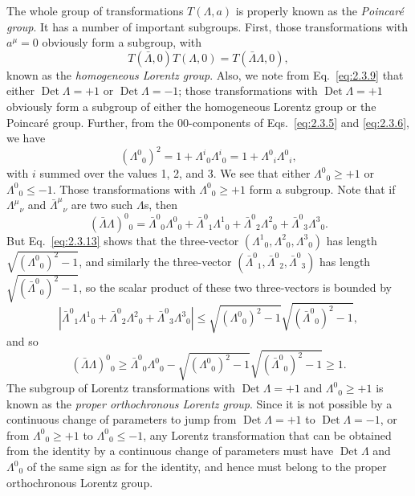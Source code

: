 The whole group of transformations $T(\Lambda,a)$ is properly known as
the \emph{Poincar\'e group}. It has
a number of important subgroups. First, those transformations with
$a^\mu=0$ obviously form a subgroup, with
\begin{equation}
  T(\bar\Lambda,0)T(\Lambda,0)=T(\bar\Lambda\Lambda,0),
  \tag{2.3.12}\label{eq:2.3.12}
\end{equation}
known as the \emph{homogeneous Lorentz group}. Also, we note from
Eq.~\eqref{eq:2.3.9} that either $\operatorname{Det}\Lambda=+1$ or
$\operatorname{Det}\Lambda=-1$; those transformations with
$\operatorname{Det}\Lambda=+1$ obviously form a subgroup of either the
homogeneous Lorentz group or the Poincar\'e group. Further, from the
$00$-components of Eqs.~\eqref{eq:2.3.5} and \eqref{eq:2.3.6}, we have
\begin{equation}
  (\Lambda^0{}_{0})^2
    =1+\Lambda^i{}_{0}\Lambda^i{}_{0}
    =1+\Lambda^0{}_{i}\Lambda^0{}_{i},
  \tag{2.3.13}\label{eq:2.3.13}
\end{equation}
with $i$ summed over the values 1, 2, and 3. We see that either
$\Lambda^0{}_{0}\geq+1$ or $\Lambda^0{}_{0}\leq-1$. Those transformations
with $\Lambda^0{}_{0}\geq+1$ form a subgroup. Note that if
$\Lambda^\mu{}_{\nu}$ and $\bar\Lambda^\mu{}_{\nu}$ are two such
$\Lambda$s, then
\begin{equation*}
  (\bar\Lambda\Lambda)^0{}_{0}
    =\bar\Lambda^0{}_{0}\Lambda^0{}_{0}
      +\bar\Lambda^0{}_{1}\Lambda^1{}_{0}
      +\bar\Lambda^0{}_{2}\Lambda^2{}_{0}
      +\bar\Lambda^0{}_{3}\Lambda^3{}_{0}.
\end{equation*}
But Eq.~\eqref{eq:2.3.13} shows that the three-vector
$(\Lambda^1{}_{0},\allowbreak\Lambda^2{}_{0},\allowbreak\Lambda^3{}_{0})$
has length
$\sqrt{(\Lambda^0{}_{0})^2-1}$, and similarly the three-vector\hfill\break
$(\bar\Lambda^0{}_{1},\allowbreak\bar\Lambda^0{}_{2},\allowbreak
\bar\Lambda^0{}_{3})$ has length
$\sqrt{(\bar\Lambda^0{}_{0})^2-1}$, so the scalar product of these
two three-vectors is bounded by
\begin{equation}
  \left|
    \bar\Lambda^0{}_{1}\Lambda^1{}_{0}
      +\bar\Lambda^0{}_{2}\Lambda^2{}_{0}
      +\bar\Lambda^0{}_{3}\Lambda^3{}_{0}
  \right|
  \leq
  \sqrt{(\Lambda^0{}_{0})^2-1}
  \sqrt{(\bar\Lambda^0{}_{0})^2-1},
  \tag{2.3.14}\label{eq:2.3.14}
\end{equation}
and so
\begin{equation*}
  (\bar\Lambda\Lambda)^0{}_{0}
  \geq \bar\Lambda^0{}_{0}\Lambda^0{}_{0}
    -\sqrt{(\Lambda^0{}_{0})^2-1}
     \sqrt{(\bar\Lambda^0{}_{0})^2-1}
  \geq 1.
\end{equation*}
The subgroup of Lorentz transformations with
$\operatorname{Det}\Lambda=+1$ and $\Lambda^0{}_{0}\geq+1$ is known as
the \emph{proper orthochronous Lorentz group}. Since it is not possible by
a continuous change of parameters to jump from
$\operatorname{Det}\Lambda=+1$ to $\operatorname{Det}\Lambda=-1$, or
from $\Lambda^0{}_{0}\geq+1$ to $\Lambda^0{}_{0}\leq-1$, any Lorentz
transformation that can be obtained from the identity by a continuous
change of parameters must have $\operatorname{Det}\Lambda$ and
$\Lambda^0{}_{0}$ of the same sign as for the identity, and hence must
belong to the proper orthochronous Lorentz group.

